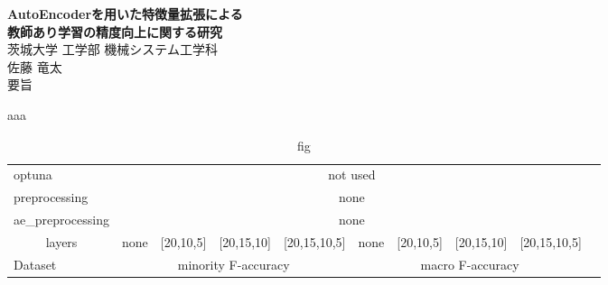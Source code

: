 \begin{center}
  \textbf{{\LARGE AutoEncoderを用いた特徴量拡張による\\教師あり学習の精度向上に関する研究\\}}
  \vspace{5mm}
  {\large 茨城大学 工学部 機械システム工学科\\
  佐藤 竜太\\}
  \vspace{5mm}
  {\large 要旨}
  \vspace{5mm}
\end{center}
aaa


\begin{table}[hbtb]
    \caption{fig}
    \label{tab:fig1}
    \centering
    \begin{tabular}{l*{9}{r}}

        \hline
        \hline

        optuna&
        \multicolumn{8}{c}{not used}\\

        preprocessing&
        \multicolumn{8}{c}{none}\\
        
        ae\_preprocessing&
        \multicolumn{8}{c}{none}\\


        \multicolumn{1}{c}{layers}&
        none&[20,10,5]&[20,15,10]&[20,15,10,5]&
        none&[20,10,5]&[20,15,10]&[20,15,10,5]\\

        \hline
        Dataset &
        \multicolumn{4}{c}{minority F-accuracy}&
        \multicolumn{4}{c}{macro F-accuracy} \\
        \hline


\end{tabular}
\end{table}
